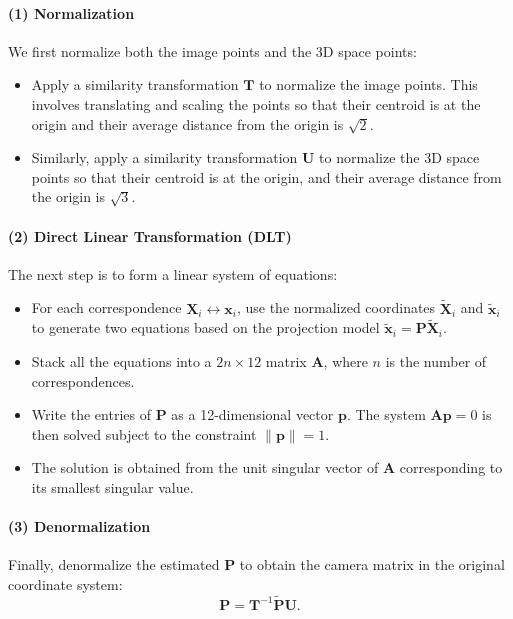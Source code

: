\documentclass[12pt]{article}
\begin{document}
\paragraph{(1) Normalization}
We first normalize both the image points and the 3D space points:
\begin{itemize}
    \item Apply a similarity transformation $ \mathbf{T} $ to normalize the image points. This involves translating and scaling the points so that their centroid is at the origin and their average distance from the origin is $\sqrt{2}$.
    \item Similarly, apply a similarity transformation $ \mathbf{U} $ to normalize the 3D space points so that their centroid is at the origin, and their average distance from the origin is $\sqrt{3}$.
\end{itemize}

\paragraph{(2) Direct Linear Transformation (DLT)}
The next step is to form a linear system of equations:
\begin{itemize}
    \item For each correspondence $ \mathbf{X}_i \leftrightarrow \mathbf{x}_i $, use the normalized coordinates $ \tilde{\mathbf{X}}_i $ and $ \tilde{\mathbf{x}}_i $ to generate two equations based on the projection model $ \tilde{\mathbf{x}}_i = \mathbf{P} \tilde{\mathbf{X}}_i $.
    \item Stack all the equations into a $ 2n \times 12 $ matrix $ \mathbf{A} $, where $ n $ is the number of correspondences.
    \item Write the entries of $ \mathbf{P} $ as a 12-dimensional vector $ \mathbf{p} $. The system $ \mathbf{A} \mathbf{p} = 0 $ is then solved subject to the constraint $ \| \mathbf{p} \| = 1 $.
    \item The solution is obtained from the unit singular vector of $ \mathbf{A} $ corresponding to its smallest singular value.
\end{itemize}

\paragraph{(3) Denormalization}
Finally, denormalize the estimated $ \mathbf{P} $ to obtain the camera matrix in the original coordinate system:
$$
\mathbf{P} = \mathbf{T}^{-1} \tilde{\mathbf{P}} \mathbf{U}.
$$
\end{document}
